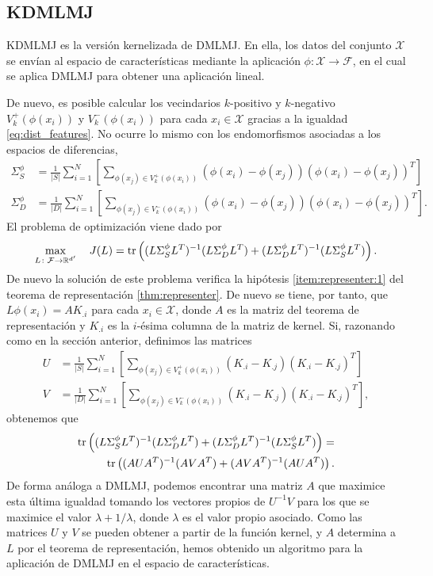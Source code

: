 \documentclass{book}
\begin{document}
\subsection{KDMLMJ}

KDMLMJ \cite{dmlmj} es la versión kernelizada de DMLMJ. En ella, los datos del conjunto $\mathcal{X}$ se envían al espacio de características mediante la aplicación $\phi\colon \mathcal{X} \to \mathcal{F}$, en el cual se aplica DMLMJ para obtener una aplicación lineal.

De nuevo, es posible calcular los vecindarios $k$-positivo y $k$-negativo $V_k^+(\phi(x_i))$ y $V_k^-(\phi(x_i))$ para cada $x_i \in \mathcal{X}$ gracias a la igualdad \ref{eq:dist_features}. No ocurre lo mismo con los endomorfismos asociadas a los espacios de diferencias,
\begin{align*}
	\Sigma_S^{\phi} &= \frac{1}{|S|}\sum_{i=1}^{N} \left[ \sum_{\phi(x_j) \in V_k^+(\phi(x_i))} (\phi(x_i)-\phi(x_j))(\phi(x_i)-\phi(x_j))^T\right] \\
	\Sigma_D^{\phi} &= \frac{1}{|D|}\sum_{i=1}^{N} \left[ \sum_{\phi(x_j) \in V_k^-(\phi(x_i))} (\phi(x_i)-\phi(x_j))(\phi(x_i)-\phi(x_j))^T\right].
\end{align*}
El problema de optimización viene dado por
\[ \max_{L \colon \mathcal{F} \to \mathbb{R}^{d'}} \quad J(L) =  \operatorname{tr}\left( (L\Sigma_S^{\phi} L^T)^{-1} (L\Sigma_D^{\phi} L^T) + (L \Sigma_D^{\phi} L^T)^{-1} (L \Sigma_S^{\phi} L^T) \right).\]
De nuevo la solución de este problema verifica la hipótesis \ref{item:representer:1} del teorema de representación \ref{thm:representer}. De nuevo se tiene, por tanto, que $L\phi(x_i) = AK_{.i}$ para cada $x_i \in \mathcal{X}$, donde $A$ es la matriz del teorema de representación y $K_{.i}$ es la $i$-ésima columna de la matriz de kernel. Si, razonando como en la sección anterior, definimos las matrices
\begin{align*}
	U &= \frac{1}{|S|}\sum_{i=1}^{N} \left[ \sum_{\phi(x_j) \in V_k^+(\phi(x_i))} (K_{.i}-K_{.j})(K_{.i}-K_{.j})^T\right] \\
	V &= \frac{1}{|D|}\sum_{i=1}^{N} \left[ \sum_{\phi(x_j) \in V_k^-(\phi(x_i))} (K_{.i}-K_{.j})(K_{.i}-K_{.j})^T\right],
\end{align*}
obtenemos que
\begin{equation*}
	\begin{split}
		\operatorname{tr}\left( (L\Sigma_S^{\phi} L^T)^{-1} (L\Sigma_D^{\phi} L^T) + (L \Sigma_D^{\phi} L^T)^{-1} (L \Sigma_S^{\phi} L^T) \right) = \\
		\operatorname{tr}\left( (AUA^T)^{-1} (AV A^T) + (A V A^T)^{-1} (A U A^T) \right).
	\end{split}
\end{equation*}
De forma análoga a DMLMJ, podemos encontrar una matriz $A$ que maximice esta última igualdad tomando los vectores propios de $U^{-1}V$ para los que se maximice el valor $\lambda + 1 /\lambda$, donde $\lambda$ es el valor propio asociado. Como las matrices $U$ y $V$ se pueden obtener a partir de la función kernel, y $A$ determina a $L$ por el teorema de representación, hemos obtenido un algoritmo para la aplicación de DMLMJ en el espacio de características.
\end{document}
